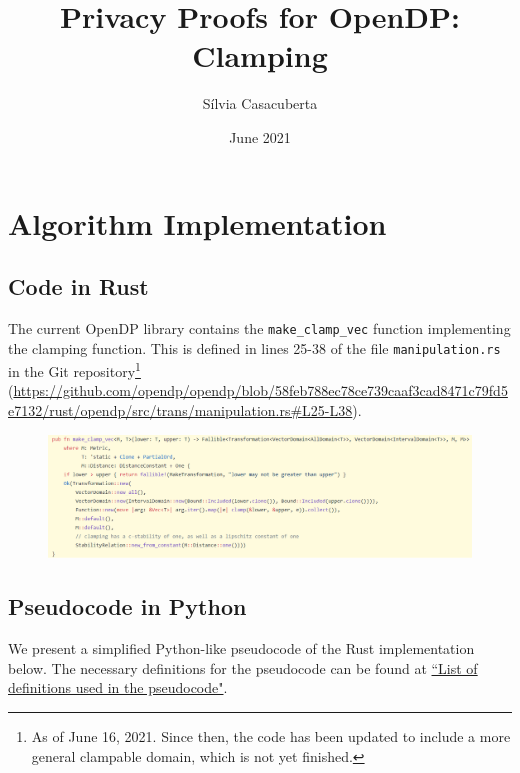 \documentclass[11pt,a4paper]{article}
\title{Privacy Proofs for OpenDP: Clamping}
\author{S\'ilvia Casacuberta}
\date{June 2021}
\theoremstyle{definition}
\begin{document}
\maketitle

\tableofcontents

\section{Algorithm Implementation}


\subsection{Code in Rust}
The current OpenDP library contains the \texttt{make\_clamp\_vec} function implementing the clamping function. This is defined in lines 25-38 of the file \texttt{manipulation.rs} in the Git repository\footnote{As of June 16, 2021. Since then, the code has been updated to include a more general clampable domain, which is not yet finished.} (\url{https://github.com/opendp/opendp/blob/58feb788ec78ce739caaf3cad8471c79fd5e7132/rust/opendp/src/trans/manipulation.rs#L25-L38}).

\begin{figure}[ht]
    \includegraphics[width=16cm]{clamp_rust.png}
    \centering
    \label{fig:code}
\end{figure}


\subsection{Pseudocode in Python}\label{sec:pseudocode}
We present a simplified Python-like pseudocode of the Rust implementation below. The necessary definitions for the pseudocode can be found at \href{https://www.overleaf.com/project/60d215bf90b337ac02200a99}{``List of definitions used in the pseudocode"}. 
\end{document}
